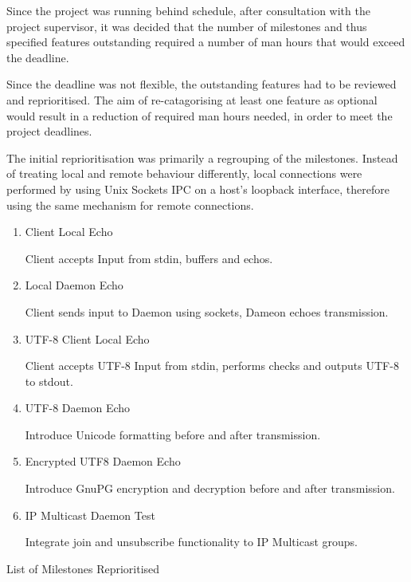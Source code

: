 
Since the project was running behind schedule, after consultation with
the project supervisor, it was decided that the number of milestones and
thus specified features outstanding required a number of man hours that
would exceed the deadline.


Since the deadline was not flexible, the outstanding features had to be 
reviewed and reprioritised. The aim of re-catagorising at least one 
feature as optional would result in a reduction of required man hours 
needed, in order to meet the project deadlines.


The initial reprioritisation was primarily a regrouping of the
milestones. Instead of treating local and remote behaviour differently,
local connections were performed by using Unix Sockets IPC on a host's
loopback interface, therefore using the same mechanism for remote
connections.

\begin{table}[Hbt]

\begin{center}

\begin{enumerate}

\item Client Local Echo 

	\subitem Client accepts Input from stdin, buffers and echos.

\item Local Daemon Echo 

	\subitem Client sends input to Daemon using sockets, Dameon 
	echoes transmission.

\item UTF-8 Client Local Echo 

	\subitem Client accepts UTF-8 Input from stdin, performs checks and
	outputs UTF-8 to stdout.

\item UTF-8 Daemon Echo

	\subitem Introduce Unicode formatting before and after transmission.

\item Encrypted UTF8 Daemon Echo 

	\subitem Introduce GnuPG encryption and decryption before and after 
	transmission. 

\item IP Multicast Daemon Test

	\subitem Integrate join and unsubscribe functionality to IP Multicast
	groups.

\end{enumerate}

\end{center}

\caption{List of Milestones Reprioritised}

\end{table}


